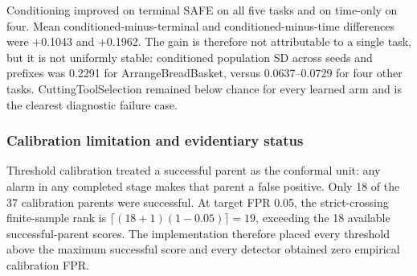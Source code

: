 \documentclass[11pt,a4paper]{article}
\begin{document}
\begin{table}[H]
\centering
\caption{Per-task prefix-1/2 selection ROC-AUC. Values average the selected
regularization over three seeds and the two primary prefixes.}
\label{tab:xr1-stage-aware-per-task}
\end{table}

Conditioning improved on terminal SAFE on all five tasks and on time-only on
four. Mean conditioned-minus-terminal and conditioned-minus-time differences
were +0.1043 and +0.1962. The gain is therefore not attributable to a single
task, but it is not uniformly stable: conditioned population SD across seeds
and prefixes was 0.2291 for ArrangeBreadBasket, versus 0.0637--0.0729 for four
other tasks. CuttingToolSelection remained below chance for every learned arm
and is the clearest diagnostic failure case.

\subsubsection{Calibration limitation and evidentiary status}
Threshold calibration treated a successful parent as the conformal unit: any
alarm in any completed stage makes that parent a false positive. Only 18 of
the 37 calibration parents were successful. At target FPR 0.05, the
strict-crossing finite-sample rank is
$\lceil(18+1)(1-0.05)\rceil=19$, exceeding the 18 available successful-parent
scores. The implementation therefore placed every threshold above the maximum
successful score and every detector obtained zero empirical calibration FPR.
\end{document}
